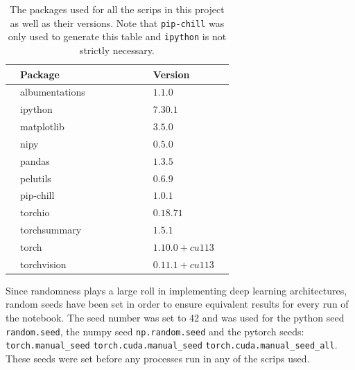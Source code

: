 \documentclass[12pt, fleqn, titlepage]{article}
\newcommand{\1}[1]{\mathds{1}\left[#1\right]}
\begin{document}
\begin{table}[H]
	\begin{center}
		\begin{tabular}{l l l l l l l l l l}
			\toprule			
			
			& \textbf{Package \cite{python_packages}}      & & & & & & & \textbf{Version}  & \\ \midrule
			& albumentations \cite{albumentations}         & & & & & & & $1.1.0$           & \\ 
			& ipython \cite{ipython}                       & & & & & & & $7.30.1$          & \\ 
			& matplotlib \cite{matplotlib}                 & & & & & & & $3.5.0$           & \\ 
			& nipy \cite{nipy}                             & & & & & & & $0.5.0$           & \\
			& pandas \cite{pandas}                         & & & & & & & $1.3.5$           & \\
			& pelutils \cite{pelutils}                     & & & & & & & $0.6.9$           & \\
			& pip-chill \cite{pip-chill}                   & & & & & & & $1.0.1$           & \\
			& torchio \cite{torchio}                       & & & & & & & $0.18.71$         & \\
			& torchsummary \cite{torchsummary}             & & & & & & & $1.5.1$           & \\
			& torch \cite{pytorch}                         & & & & & & & $1.10.0+cu113$    & \\
			& torchvision \cite{torchvision}               & & & & & & & $0.11.1+cu113$    & \\
			\bottomrule
		\end{tabular}
		\caption{The packages used for all the scrips in this project as well as their versions. Note that \texttt{pip-chill} was only used to generate this table and \texttt{ipython} is not strictly necessary.}
		\label{tab:packages}
	\end{center}
\end{table}
\noindent Since randomness plays a large roll in implementing deep learning architectures, random seeds have been set in order to ensure equivalent results for every run of the notebook. The seed number was set to 42 and was used for the python seed \texttt{random.seed}, the numpy seed \texttt{np.random.seed} and the pytorch seeds: \newline \texttt{torch.manual\_seed} \texttt{torch.cuda.manual\_seed}
\texttt{torch.cuda.manual\_seed\_all}. These seeds were set before any processes run in any of the scrips used.
\end{document}
